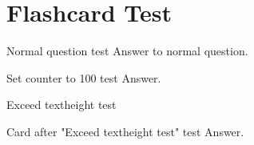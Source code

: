 \documentclass{../flashcard}
\begin{document}
\section{Flashcard Test}

\begin{card}{Normal question test}
Answer to normal question.
\end{card}

\setcounter{card}{100}

\begin{card}{Set counter to 100 test}
Answer.
\end{card}


\begin{card}{Exceed textheight test}
\footnotesize
\blindtext[4]
\end{card}

\begin{card}{Card after "Exceed textheight test" test}
Answer.
\end{card}


\listofcard

\printindex
\end{document}
